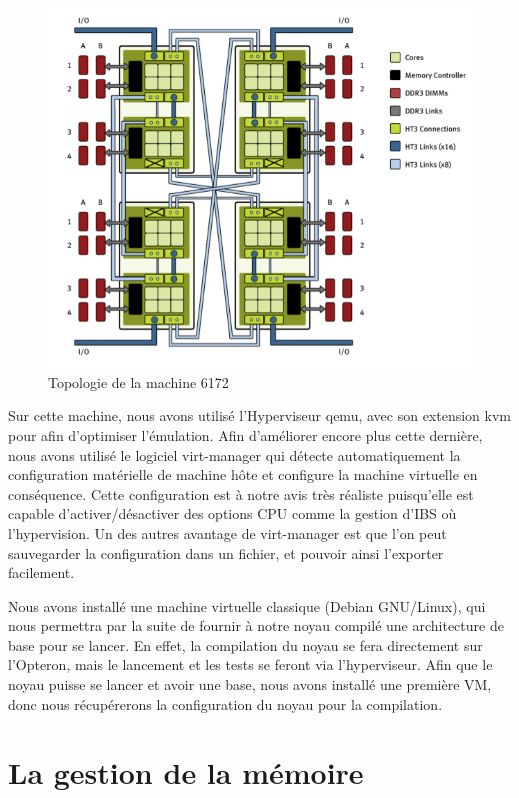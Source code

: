     \begin{figure}[!h]
      \centering
      \includegraphics[scale=0.4]{img/numa_arch_details.png}
      \caption{Topologie de la machine 6172}
      \label{f:numa_topology}
    \end{figure}

    Sur cette machine, nous avons utilisé l'Hyperviseur qemu, avec son extension
    kvm pour afin d'optimiser l'émulation. Afin d'améliorer encore plus cette
    dernière, nous avons utilisé le logiciel virt-manager qui détecte
    automatiquement la configuration matérielle de machine hôte et configure la
    machine virtuelle en conséquence. Cette configuration est à notre avis très
    réaliste puisqu'elle est capable d'activer/désactiver des options CPU comme
    la gestion d'IBS où l'hypervision. Un des autres avantage de virt-manager
    est que l'on peut sauvegarder la configuration dans un fichier, et pouvoir
    ainsi l'exporter facilement.

    Nous avons installé une machine virtuelle classique (Debian GNU/Linux), qui
    nous permettra par la suite de fournir à notre noyau compilé une
    architecture de base pour se lancer. En effet, la compilation du noyau se
    fera directement sur l'Opteron, mais le lancement et les tests se feront via
    l'hyperviseur. Afin que le noyau puisse se lancer et avoir une base, nous
    avons installé une première VM, donc nous récupérerons la configuration du
    noyau pour la compilation.

  \section{La gestion de la mémoire}
  
